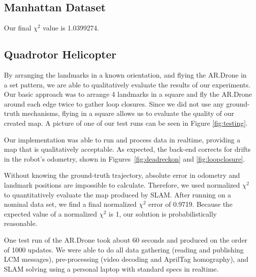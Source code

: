 \documentclass[conference]{IEEEtran}
\begin{document}
\subsection{Manhattan Dataset}
\label{sub:manhattandataset}

Our final $\chi^2$ value is 1.0399274.


\subsection{Quadrotor Helicopter}
\label{sub:results}

By arranging the landmarks in a known orientation, and flying the AR.Drone in a set
pattern, we are able to qualitatively evaluate the results of our experiments.  Our basic
approach was to arrange 4 landmarks in a square and fly the AR.Drone around each edge
twice to gather loop closures.  Since we did not use any ground-truth mechanisms, flying
in a square allows us to evaluate the quality of our created map. A picture of one of our
test runs can be seen in Figure \ref{fig:testing}.

Our implementation was able to run and process data in realtime, providing a map that is
qualitatively acceptable.  As expected, the back-end corrects for drifts in the robot's
odometry, shown in Figures~\ref{fig:deadreckon} and \ref{fig:loopclosure}.


Without knowing the ground-truth trajectory, absolute error in odometry and landmark
positions are impossible to calculate.  Therefore, we used normalized $\chi^2$ to
quantitatively evaluate the map produced by \ac{SLAM}.  After running on a nominal data
set, we find a final normalized $\chi^2$ error of 0.9719.  Because the expected
value of a normalized $\chi^2$ is 1, our solution is probabilistically reasonable.

One test run of the AR.Drone took about 60 seconds and produced on the order of 1000
updates. We were able to do all data gathering (reading and publishing LCM messages),
pre-processing (video decoding and AprilTag homography), and \ac{SLAM} solving using a personal
laptop with standard specs in realtime.
\end{document}
